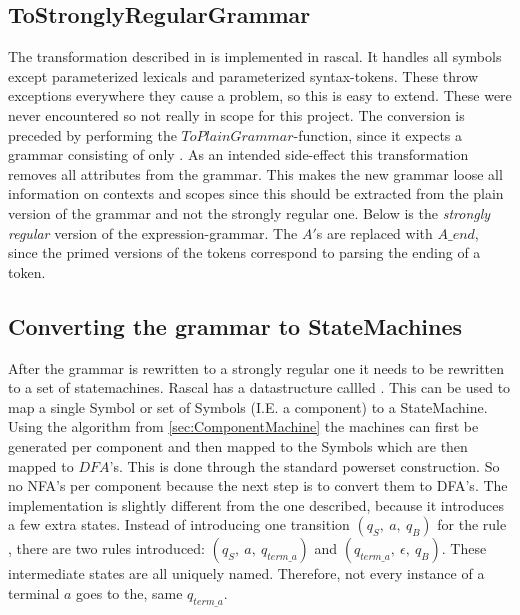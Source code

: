 \subsection{ToStronglyRegularGrammar}
The transformation described in \cite{MohriNederhof} is implemented in rascal. It handles all symbols except parameterized lexicals and parameterized syntax-tokens. These throw exceptions everywhere they cause a problem, so this is easy to extend. These were never encountered so not really in scope for this project. The conversion is preceded by performing the $ToPlainGrammar$-function, since it expects a grammar consisting of only . As an intended side-effect this transformation removes all attributes from the grammar. This makes the new grammar loose all information on contexts and scopes since this should be extracted from the plain version of the grammar and not the strongly regular one. Below is the \emph{strongly regular} version of the expression-grammar. The $A'$s are replaced with $A\_end$, since the primed versions of the tokens correspond to parsing the ending of a token.

\subsection{Converting the grammar to StateMachines} 
After the grammar is rewritten to a strongly regular one it needs to be rewritten to a set of statemachines. Rascal has a datastructure callled . This can be used to map a single Symbol or set of Symbols (I.E. a component) to a StateMachine. Using the algorithm from \ref{sec:ComponentMachine} the machines can first be generated per component and then mapped to the Symbols which are then mapped to $DFA$'s. This is done through the standard powerset construction. So no NFA's per component because the next step is to convert them to DFA's. The implementation is slightly different from the one described, because it introduces a few extra states. Instead of introducing one transition $(q_S,\ a,\ q_B)$ for the rule , there are two rules introduced: $(q_S,\ a,\ q_{term\_a})$ and $(q_{term\_a},\ \epsilon,\ q_B)$. These intermediate states are all uniquely named. Therefore, not every instance of a terminal $a$ goes to the, same $q_{term\_a}$.

\pagebreak
